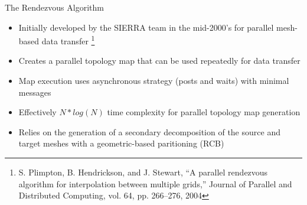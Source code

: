 \documentclass{beamer}
\begin{document}
\begin{frame}{The Rendezvous Algorithm}

  \begin{itemize}
    \item Initially developed by the SIERRA team in the mid-2000's for
      parallel mesh-based data transfer \footnote{S. Plimpton,
        B. Hendrickson, and J. Stewart, “A parallel rendezvous
        algorithm for interpolation between multiple grids,” Journal
        of Parallel and Distributed Computing, vol. 64, pp. 266–276,
        2004}
      \medskip
    \item Creates a parallel topology map that can be used repeatedly
      for data transfer
    \item Map execution uses asynchronous strategy (posts and waits)
      with minimal messages
    \item Effectively $N*log(N)$ time complexity for parallel topology
      map generation
      \medskip
    \item Relies on the generation of a secondary decomposition of the
      source and target meshes with a geometric-based paritioning
      (RCB)
  \end{itemize}

\end{frame}
\end{document}
